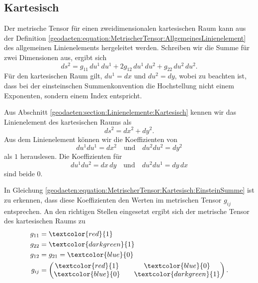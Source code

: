 %
%
%
%
\subsection{Kartesisch\label{geodaeten:section:MetrischerTensor:Kartesisch}}

Der metrische Tensor für einen zweidimensionalen kartesischen Raum kann aus der Definition \eqref{geodaeten:equation:MetrischerTensor:AllgemeinesLinienelement} des allgemeinen Linienelements hergeleitet werden.
Schreiben wir die Summe für zwei Dimensionen aus, ergibt sich
\begin{equation}
	ds^2 = g_{11} \, du^1 \, du^1 + 2g_{12} \, du^1 \, du^2 + g_{22} \, du^2 \, du^2.
	\label{geodaeten:equation:MetrischerTensor:Kartesisch:EinsteinSumme}
\end{equation}
Für den kartesischen Raum gilt, $du^1 = dx$ und $du^2 = dy$, wobei zu beachten ist, dass bei der einsteinschen Summenkonvention die Hochstellung nicht einem Exponenten, sondern einem Index entspricht.

Aus Abschnitt \ref{geodaeten:section:Linienelemente:Kartesisch} kennen wir das Linienelement des kartesischen Raums als
\begin{equation}
	ds^2 = dx^2 + dy^2 .
\end{equation}
Aus dem Linienelement können wir die Koeffizienten von 
\begin{equation}
	du^1 du^1 = dx^2 \quad \text{und} \quad du^2  du^2 = dy^2 
\end{equation}
als $1$ herauslesen. 
Die Koeffizienten für
\begin{equation}
du^1  du^2 = dx \, dy \quad \text{und} \quad du^2  du^1 = dy \,  dx
\end{equation}
sind beide $0$.

In Gleichung \eqref{geodaeten:equation:MetrischerTensor:Kartesisch:EinsteinSumme} ist zu erkennen, dass diese Koeffizienten den Werten im metrischen Tensor $g_{ij}$ entsprechen.
An den richtigen Stellen eingesetzt ergibt sich der metrische Tensor des kartesischen Raums zu
\begin{equation}
	\begin{aligned}
		g_{11} &= \textcolor{red}{1} \\
		g_{22} &= \textcolor{darkgreen}{1} \\
		g_{12} &= g_{21} = \textcolor{blue}{0} \\
		g_{ij} &= \begin{pmatrix} \textcolor{red}{1} && \textcolor{blue}{0} \\ \textcolor{blue}{0} && \textcolor{darkgreen}{1} \end{pmatrix} .
	\end{aligned}
\end{equation}
